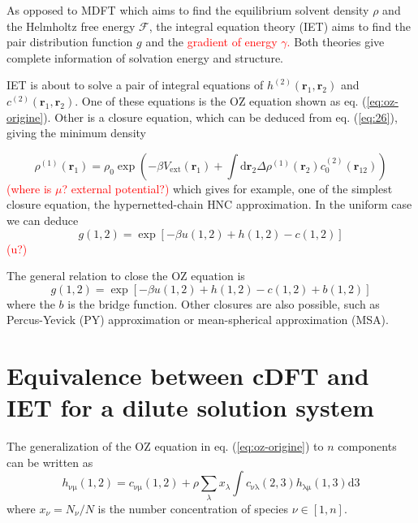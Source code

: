 As opposed to \acs{MDFT} which aims to find the equilibrium solvent
density $\rho$ and the Helmholtz free energy $\mathcal{F}$, the
integral equation theory (\acs{IET}) aims to find the pair distribution
function $g$ and the \textcolor{red}{gradient of energy $\gamma$.}
Both theories give complete information of solvation energy and structure.

\acs{IET} is about to solve a pair of integral equations of $h^{(2)}(\mathbf{r}_{1},\mathbf{r}_{2})$
and $c^{(2)}(\mathbf{r}_{1},\mathbf{r}_{2})$. One of these equations
is the \acs{OZ} equation shown as eq. (\ref{eq:oz-origine}). Other
is a closure equation, which can be deduced from eq. (\ref{eq:26}),
giving the minimum density 

\begin{equation}
\rho^{(1)}(\mathbf{r}_{1})=\rho_{0}\exp\left(-\beta V_{\mathrm{ext}}(\mathbf{r}_{1})+\int\mathrm{d}\mathbf{\mathbf{r}}_{2}\Delta\rho^{(1)}(\mathbf{r}_{2})c_{0}^{(2)}(\mathbf{r}_{12})\right)\label{eq:minimize-anal}
\end{equation}
\textcolor{red}{(where is $\mu$? external potential?)} which gives
for example, one of the simplest closure equation, the hypernetted-chain
\acs{HNC} approximation. In the uniform case we can deduce
\begin{equation}
g(1,2)=\exp\left[-\beta u(1,2)+h(1,2)-c(1,2)\right]
\end{equation}
\textcolor{red}{(u?) }

The general relation to close the OZ equation is
\begin{equation}
g(1,2)=\exp\left[-\beta u(1,2)+h(1,2)-c(1,2)+b(1,2)\right]
\end{equation}
where the $b$ is the bridge function. Other closures are also possible,
such as Percus-Yevick (PY) approximation or mean-spherical approximation
(MSA).

\section{Equivalence between cDFT and IET for a dilute solution system\label{sec:Equivalence-iet-mdft}}

The generalization of the \acs{OZ} equation in eq. (\ref{eq:oz-origine})
to $n$ components can be written as
\begin{equation}
h_{\mathrm{\nu\mu}}(1,2)=c_{\mathrm{\nu\mu}}(1,2)+\rho\sum_{\lambda}x_{\lambda}\int c_{\mathrm{\nu\lambda}}(2,3)h_{\mathrm{\lambda\mu}}(1,3)\mathrm{d}3
\end{equation}
where $x_{\nu}=N_{\nu}/N$ is the number concentration of species
$\nu\in\left[1,n\right]$.

